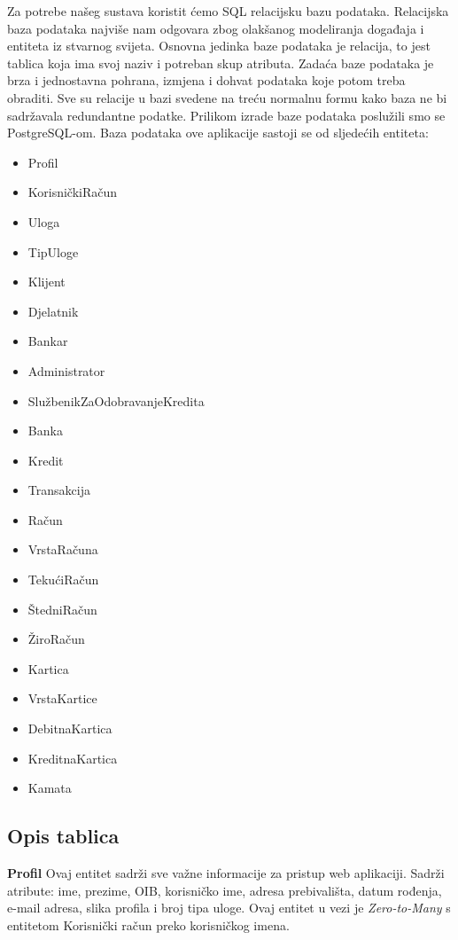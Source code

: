 			
		Za potrebe našeg sustava koristit ćemo SQL relacijsku bazu podataka. Relacijska baza podataka najviše nam odgovara zbog olakšanog modeliranja događaja i entiteta iz stvarnog svijeta. Osnovna jedinka baze podataka je relacija, to jest tablica koja ima svoj naziv i potreban skup atributa. Zadaća baze podataka je brza i jednostavna pohrana, izmjena i dohvat podataka koje potom treba obraditi. Sve su relacije u bazi svedene na treću normalnu formu kako baza ne bi sadržavala redundantne podatke. Prilikom izrade baze podataka poslužili smo se PostgreSQL-om.
		Baza podataka ove aplikacije sastoji se od sljedećih entiteta:
		\begin{itemize}
			\item 	Profil
			\item 	KorisničkiRačun
			\item 	Uloga
			\item   TipUloge
			\item   Klijent
			\item   Djelatnik
			\item   Bankar
			\item   Administrator
			\item   SlužbenikZaOdobravanjeKredita
			\item   Banka
			\item   Kredit
			\item   Transakcija
			\item   Račun
			\item   VrstaRačuna
			\item   TekućiRačun
			\item   ŠtedniRačun
			\item   ŽiroRačun
			\item   Kartica
			\item   VrstaKartice
			\item   DebitnaKartica
			\item   KreditnaKartica
			\item   Kamata		
		\end{itemize}
		
			\subsection{Opis tablica}
			

				\textbf{Profil} Ovaj entitet sadrži sve važne informacije za pristup web aplikaciji. Sadrži atribute: ime, prezime, OIB, korisničko ime, adresa prebivališta, datum rođenja, e-mail adresa, slika profila i broj tipa uloge. Ovaj entitet u vezi je \textit{Zero-to-Many} s entitetom Korisnički račun preko korisničkog imena.  
				
